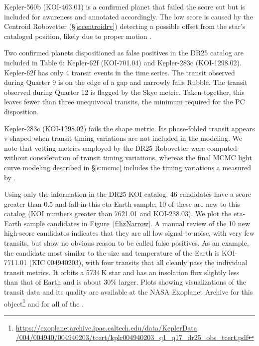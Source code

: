 Kepler-560b (KOI-463.01) is a confirmed planet that failed the score cut but is included for awareness and annotated accordingly.  The low score is caused by the Centroid Robovetter (\S\ref{s:centroidrv}) detecting a possible offset from the star's cataloged position, likely due to proper motion \citep{Mann2017}.  

Two confirmed planets dispositioned as false positives in the DR25 catalog are included in Table 6: Kepler-62f (KOI-701.04) and Kepler-283c (KOI-1298.02).  Kepler-62f has only 4 transit events in the time series.  The transit observed during Quarter 9 is on the edge of a gap and narrowly fails Rubble.  The transit observed during Quarter 12 is flagged by the Skye metric.  Taken together, this leaves fewer than three unequivocal transits, the minimum required for the PC disposition. 

Kepler-283c (KOI-1298.02) fails the shape metric.  Its phase-folded transit appears v-shaped when transit timing variations are not included in the modeling.  We note that vetting metrics employed by the DR25 Robovetter were computed without consideration of transit timing variations, whereas the final MCMC light curve modeling described in \S\ref{s:mcmc} includes the timing variations a measured by \cite{Rowe2015cat}. 

Using only the information in the DR25 KOI catalog,  46 candidates have a score greater than 0.5 and fall in this eta-Earth sample; 10 of these are new to this catalog (KOI numbers greater than 7621.01 and KOI-238.03).  We plot the eta-Earth sample candidates in Figure~\ref{f:hzNarrow}.  A manual review of the 10 new high-score candidates indicates that they are all low signal-to-noise, with very few transits, but show no obvious reason to be called false positives. As an example, the candidate most similar to the size and temperature of the Earth is KOI-7711.01 (KIC 004940203), with four transits that all cleanly pass the individual transit metrics. It orbits a 5734\,K star and has an insolation flux slightly less than that of Earth and is about 30\% larger.  Plots showing visualizations of the transit data and its quality are available at the NASA Exoplanet Archive for this object\footnote{\url{https://exoplanetarchive.ipac.caltech.edu/data/KeplerData /004/004940/004940203/tcert/kplr004940203\_q1\_q17\_dr25\_obs\_tcert.pdf}} and for all of the .


